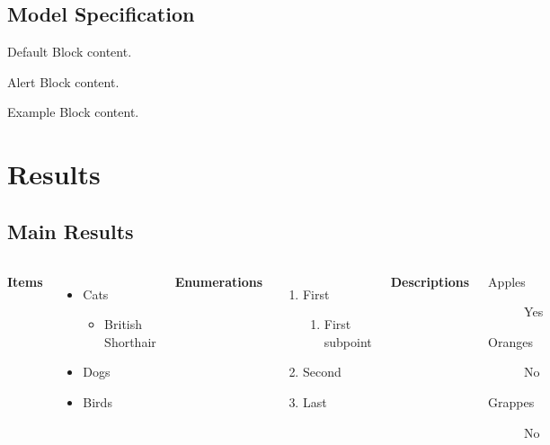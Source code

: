 \documentclass[
11pt,notheorems,compress,hyperref={pdfauthor=Maghfira Ramadhani}
]{beamer}
\begin{document}
\subsection{Model Specification}
\begin{frame}

   \centering
	\begin{minipage}[b]{0.5\textwidth}

	  \begin{block}{Default}
        Block content.
      \end{block}

      \begin{alertblock}{Alert}
        Block content.
      \end{alertblock}

      \begin{exampleblock}{Example}
        Block content.
      \end{exampleblock}      
      
	\end{minipage}	
\end{frame}

\section{Results}
\subsection{Main Results}
\begin{frame}
    \begin{columns}[T,onlytextwidth]
      \textbf{Items}
      \begin{itemize}
        \item Cats 
        \begin{itemize}
            \item British Shorthair
        \end{itemize}
        \item Dogs \item Birds
      \end{itemize}

      \textbf{Enumerations}
      \begin{enumerate}
        \item First 
        \begin{enumerate}
            \item First subpoint
        \end{enumerate}
        \item Second \item Last
      \end{enumerate}

      \textbf{Descriptions}
      \begin{description}
        \item[Apples] Yes \item[Oranges] No \item[Grappes] No
      \end{description}
\end{columns}
\end{frame}
\end{document}
